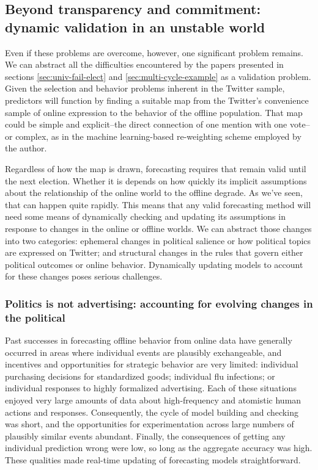\documentclass{article}
\begin{document}
\subsection{Beyond transparency and commitment: dynamic validation in
  an unstable world}
\label{sec:dynamic-validation}

Even if these problems are overcome, however, one significant problem
remains. We can abstract all the difficulties encountered by the
papers presented in sections \ref{sec:univ-fail-elect} and
\ref{sec:multi-cycle-example} as a validation problem. Given the
selection and behavior problems inherent in the Twitter sample,
predictors will function by finding a suitable map from the Twitter's
convenience sample of online expression to the behavior of the offline
population. That map could be simple and explicit--the direct
connection of one mention with one vote--or complex, as in the machine
learning-based re-weighting scheme employed by the author.

Regardless of how the map is drawn, forecasting requires that remain
valid until the next election. Whether it is depends on how quickly
its implicit assumptions about the relationship of the online world to
the offline degrade. As we've seen, that can happen quite
rapidly. This means that any valid forecasting method will need some
means of dynamically checking and updating its assumptions in response
to changes in the online or offline worlds. We can abstract those
changes into two categories: ephemeral changes in political salience
or how political topics are expressed on Twitter; and structural
changes in the rules that govern either political outcomes or online
behavior. Dynamically updating models to account for these changes
poses serious challenges.

\subsubsection{Politics is not advertising: accounting for evolving changes in the political}
\label{sec:acco-evolv-chang}

Past successes in forecasting offline behavior from online data have
generally occurred in areas where individual events are plausibly
exchangeable, and incentives and opportunities for strategic behavior
are very limited: individual purchasing decisions for standardized
goods; individual flu infections; or individual responses to highly
formalized advertising. Each of these situations enjoyed very large
amounts of data about high-frequency and atomistic human actions and
responses. Consequently, the cycle of model building and checking was
short, and the opportunities for experimentation across large numbers
of plausibly similar events abundant. Finally, the consequences of
getting any individual prediction wrong were low, so long as the
aggregate accuracy was high. These qualities made real-time updating
of forecasting models straightforward.
\end{document}
